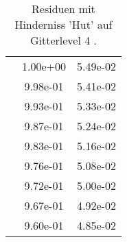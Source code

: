 \begin{table}
\begin{tabular}{c|cc|}
\multicolumn{1}{|c|}{} & \multicolumn{1}{|c|}{  1.00e+00} & \multicolumn{1}{|c|}{  5.49e-02} \\ 
\multicolumn{1}{|c|}{} & \multicolumn{1}{|c|}{  9.98e-01} & \multicolumn{1}{|c|}{  5.41e-02} \\ 
\multicolumn{1}{|c|}{} & \multicolumn{1}{|c|}{  9.93e-01} & \multicolumn{1}{|c|}{  5.33e-02} \\ 
\multicolumn{1}{|c|}{} & \multicolumn{1}{|c|}{  9.87e-01} & \multicolumn{1}{|c|}{  5.24e-02} \\ 
\multicolumn{1}{|c|}{} & \multicolumn{1}{|c|}{  9.83e-01} & \multicolumn{1}{|c|}{  5.16e-02} \\ 
\multicolumn{1}{|c|}{} & \multicolumn{1}{|c|}{  9.76e-01} & \multicolumn{1}{|c|}{  5.08e-02} \\ 
\multicolumn{1}{|c|}{} & \multicolumn{1}{|c|}{  9.72e-01} & \multicolumn{1}{|c|}{  5.00e-02} \\ 
\multicolumn{1}{|c|}{} & \multicolumn{1}{|c|}{  9.67e-01} & \multicolumn{1}{|c|}{  4.92e-02} \\ 
\multicolumn{1}{|c|}{} & \multicolumn{1}{|c|}{  9.60e-01} & \multicolumn{1}{|c|}{  4.85e-02} \\ 
\hline 
\end{tabular}\caption{Residuen mit Hinderniss 'Hut' auf Gitterlevel 4 .}\label{tab:Residuum_Hut_level4}
\end{table} 
